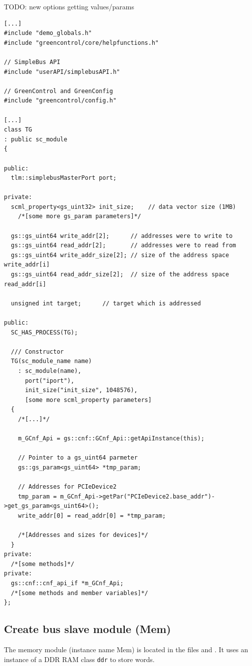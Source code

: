 TODO: new options getting values/params

\begin{lstlisting}
[...]
#include "demo_globals.h"
#include "greencontrol/core/helpfunctions.h"

// SimpleBus API
#include "userAPI/simplebusAPI.h"

// GreenControl and GreenConfig
#include "greencontrol/config.h"

[...]
class TG
: public sc_module
{
  
public:
  tlm::simplebusMasterPort port;

private:
  scml_property<gs_uint32> init_size;    // data vector size (1MB)
	/*[some more gs_param parameters]*/

  gs::gs_uint64 write_addr[2];      // addresses were to write to
  gs::gs_uint64 read_addr[2];       // addresses were to read from
  gs::gs_uint64 write_addr_size[2]; // size of the address space write_addr[i]
  gs::gs_uint64 read_addr_size[2];  // size of the address space read_addr[i]

  unsigned int target;      // target which is addressed

public:
  SC_HAS_PROCESS(TG);
	
  /// Constructor
  TG(sc_module_name name)
    : sc_module(name),
      port("iport"),
      init_size("init_size", 1048576),
      [some more scml_property parameters]
  { 
    /*[...]*/
    
    m_GCnf_Api = gs::cnf::GCnf_Api::getApiInstance(this);
    
    // Pointer to a gs_uint64 parmeter
    gs::gs_param<gs_uint64> *tmp_param;

    // Addresses for PCIeDevice2
    tmp_param = m_GCnf_Api->getPar("PCIeDevice2.base_addr")->get_gs_param<gs_uint64>();
    write_addr[0] = read_addr[0] = *tmp_param;

    /*[Addresses and sizes for devices]*/
  }
private:
  /*[some methods]*/
private:
  gs::cnf::cnf_api_if *m_GCnf_Api;
  /*[some methods and member variables]*/
};
\end{lstlisting}


\subsection{Create bus slave module (Mem)}
\label{Mem}

The memory module (instance name Mem) is located in the files  and . It uses an instance of a DDR RAM class \lstinline|ddr| to store words.

